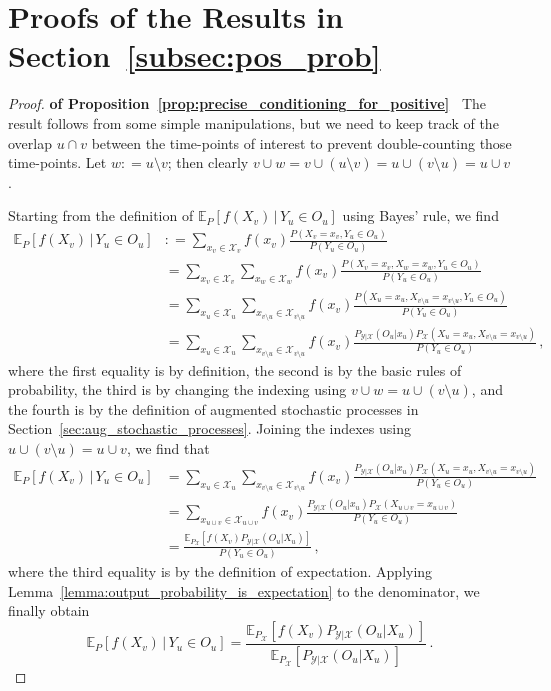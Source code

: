\documentclass[3p]{elsarticle}
\newcommand{\states}{\mathcal{X}}
\newcommand{\observs}{\mathcal{Y}}
\newcommand{\coloneqq}{:\!=}
\begin{document}
\section{Proofs of the Results in Section~\ref{subsec:pos_prob}}

\begin{proof}{\bf of Proposition~\ref{prop:precise_conditioning_for_positive}~}
The result follows from some simple manipulations, but we need to keep track of the overlap $u\cap v$ between the time-points of interest to prevent double-counting those time-points. Let $w\coloneqq u\setminus v$; then clearly $v\cup w = v\cup (u\setminus v) = u\cup (v\setminus u)=u\cup v$.

Starting from the definition of $\mathbb{E}_P[f(X_v)\,\vert\,Y_u\in O_u]$ using Bayes' rule, we find
\begin{align*}
\mathbb{E}_P[f(X_v)\,\vert\,Y_u\in O_u] &\coloneqq \sum_{x_v\in\states_v} f(x_v)\frac{P(X_v=x_v, Y_u\in O_u)}{P(Y_u\in O_u)} \\
&= \sum_{x_v\in\states_v} \sum_{x_w\in\states_w} f(x_v)\frac{P(X_v=x_v, X_w=x_w, Y_u\in O_u)}{P(Y_u\in O_u)} \\
&= \sum_{x_u\in\states_u}\sum_{x_{v\setminus u}\in\states_{v\setminus u}} f(x_v)\frac{P(X_u=x_u, X_{v\setminus u}=x_{v\setminus u}, Y_u\in O_u)}{P(Y_u\in O_u)} \\
&= \sum_{x_u\in\states_u}\sum_{x_{v\setminus u}\in\states_{v\setminus u}} f(x_v)\frac{P_{\observs\vert\states}(O_u\vert x_u)P_\states(X_u=x_u, X_{v\setminus u}=x_{v\setminus u})}{P(Y_u\in O_u)}\,,
\end{align*}
where the first equality is by definition, the second is by the basic rules of probability, the third is by changing the indexing using $v\cup w=u\cup(v\setminus u)$, and the fourth is by the definition of augmented stochastic processes in Section~\ref{sec:aug_stochastic_processes}. Joining the indexes using $u\cup(v\setminus u)=u\cup v$, we find that
\begin{align*}
\mathbb{E}_P[f(X_v)\,\vert\,Y_u\in O_u] &= \sum_{x_u\in\states_u}\sum_{x_{v\setminus u}\in\states_{v\setminus u}} f(x_v)\frac{P_{\observs\vert\states}(O_u\vert x_u)P_\states(X_u=x_u, X_{v\setminus u}=x_{v\setminus u})}{P(Y_u\in O_u)} \\
 &= \sum_{x_{u\cup v}\in\states_{u\cup v}} f(x_v)\frac{P_{\observs\vert\states}(O_u\vert x_u)P_\states(X_{u\cup v}=x_{u\cup v})}{P(Y_u\in O_u)} \\
 &= \frac{\mathbb{E}_{P_\states}[f(X_v)P_{\observs\vert\states}(O_u\vert X_u)]}{P(Y_u\in O_u)}\,,
\end{align*}
where the third equality is by the definition of expectation. Applying Lemma~\ref{lemma:output_probability_is_expectation} to the denominator, we finally obtain
\begin{equation*}
\mathbb{E}_P[f(X_v)\,\vert\,Y_u\in O_u] = \frac{\mathbb{E}_{P_\states}[f(X_v)P_{\observs\vert\states}(O_u\vert X_u)]}{\mathbb{E}_{P_\states}[P_{\observs\vert\states}(O_u\vert X_u)]}\,.
\end{equation*}
\end{proof}
\end{document}
